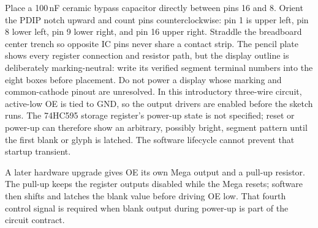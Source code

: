 \documentclass[11pt]{article}
\begin{document}
Place a 100\,nF ceramic bypass capacitor directly between pins 16 and 8.
Orient the PDIP notch upward and count pins counterclockwise: pin 1 is upper
left, pin 8 lower left, pin 9 lower right, and pin 16 upper right. Straddle the
breadboard center trench so opposite IC pins never share a contact strip. The
pencil plate shows every register connection and resistor path, but the
display outline is deliberately marking-neutral: write its verified segment
terminal numbers into the eight boxes before placement. Do not power a display
whose marking and common-cathode pinout are unresolved. In this introductory
three-wire circuit, active-low OE is tied to GND, so the output drivers are
enabled before the sketch runs. The 74HC595 storage register's power-up state
is not specified; reset or power-up can therefore show an arbitrary, possibly
bright, segment pattern until the first blank or glyph is latched. The
software lifecycle cannot prevent that startup transient.

A later hardware upgrade gives OE its own Mega output and a pull-up resistor.
The pull-up keeps the register outputs disabled while the Mega resets; software
then shifts and latches the blank value before driving OE low. That fourth
control signal is required when blank output during power-up is part of the
circuit contract.
\end{document}
